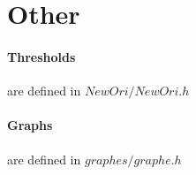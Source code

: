 \section{Other}

\paragraph{Thresholds}
are defined in $NewOri/NewOri.h$

\paragraph{Graphs}
are defined in $graphes/graphe.h$